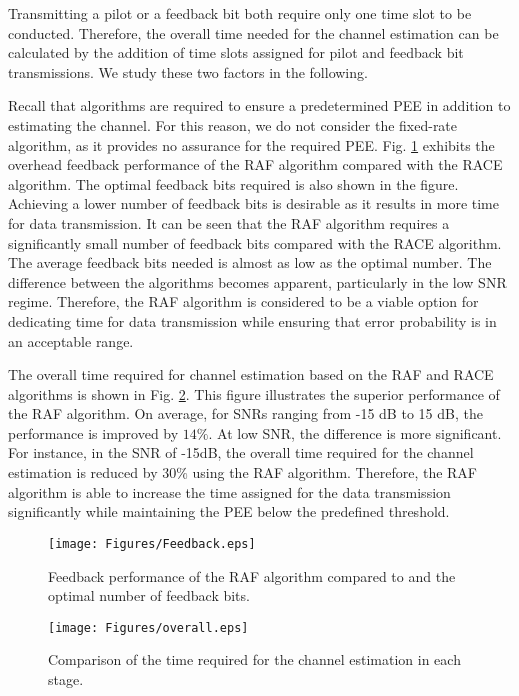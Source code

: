 \documentclass{ieeeaccess}
\begin{document}
Transmitting a pilot or a feedback bit both require only one time slot to be conducted. Therefore, the overall time needed for the channel estimation can be calculated by the addition of time slots assigned for pilot and feedback bit transmissions. We study these two factors in the following.

Recall that algorithms are required to ensure a predetermined PEE in addition to estimating the channel. For this reason, we do not consider the fixed-rate algorithm, as it provides no assurance for the required PEE. Fig. \ref{feedback} exhibits the overhead feedback performance of the RAF algorithm compared with the RACE algorithm. The optimal feedback bits required is also shown in the figure. Achieving a lower number of feedback bits is desirable as it results in more time for data transmission. It can be seen that the RAF algorithm requires a significantly small number of feedback bits compared with the RACE algorithm. The average feedback bits needed is almost as low as the optimal number. The difference between the algorithms becomes apparent, particularly in the low SNR regime. Therefore, the RAF algorithm is considered to be a viable option for dedicating time for data transmission while ensuring that error probability is in an acceptable range.

The overall time required for channel estimation based on the RAF and RACE algorithms is shown in Fig. \ref{s}. This figure illustrates the superior performance of the RAF algorithm. On average, for SNRs ranging from -15 dB to 15 dB, the performance is improved by $14\%$. At low SNR, the difference is more significant. For instance, in the SNR of -15dB, the overall time required for the channel estimation is reduced by $30\%$ using the RAF algorithm. Therefore, the RAF algorithm is able to increase the time assigned for the data transmission significantly while maintaining the PEE below the predefined threshold.


\begin{figure}[t!]
\centering
\texttt{[image: Figures/Feedback.eps]}
\caption{Feedback performance of the RAF algorithm compared to \cite{RACE} and the optimal number of feedback bits.}
\label{feedback}
\end{figure}


\begin{figure}[t!]
\centering
\texttt{[image: Figures/overall.eps]}
\caption{Comparison of the time required for the channel estimation in each stage.}
\label{s}
\end{figure}
%
\end{document}
